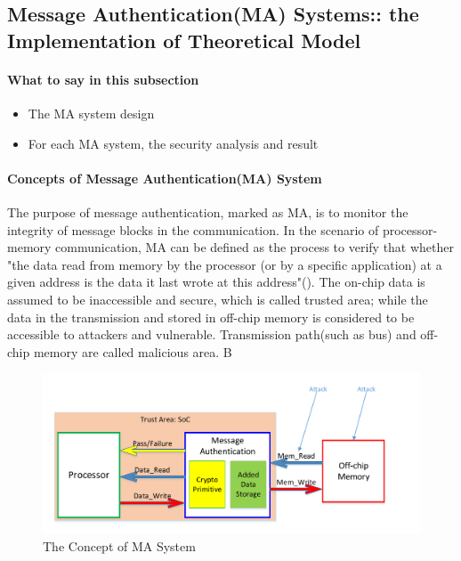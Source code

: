 \documentclass{article}
\begin{document}
\subsection{Message Authentication(MA) Systems:: the Implementation of Theoretical Model}
\paragraph{What to say in this subsection}
\begin{itemize}
	\item The MA system design
	\item For each MA system, the security analysis and result
\end{itemize}
\paragraph{Concepts of Message Authentication(MA) System}
The purpose of message authentication, marked as MA, is to monitor the integrity of message blocks in the communication. In the scenario of processor-memory communication, MA can be defined as the process to verify that whether "the data read from memory by the processor (or by a specific application) at a given address is the data it last wrote at this address"(\cite{hm_survey}). The on-chip data is assumed to be inaccessible and secure, which is called trusted area; while the data in the transmission and stored in off-chip memory is considered to be accessible to attackers and vulnerable. Transmission path(such as bus) and off-chip memory are called malicious area. 
B\begin{figure}[htbp]
\centering
\includegraphics[scale=0.5]{./diagrams/MA_concept.pdf}
\caption{The Concept of MA System}
\label{ma_system}
\end{figure}
\end{document}
